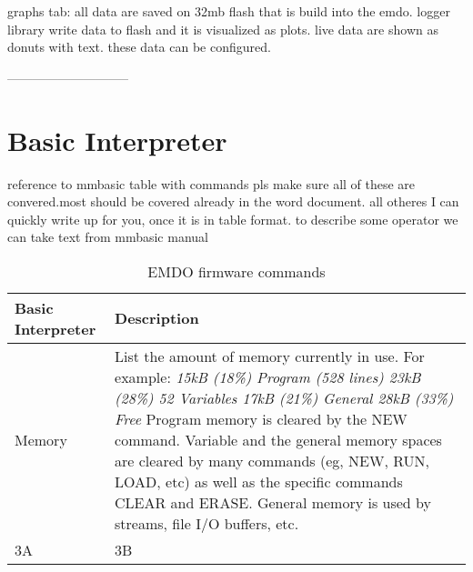 \documentclass[11pt,fleqn]{book} %
\numberwithin{equation}{section} %
\numberwithin{figure}{section} %
\numberwithin{table}{section} %
\begin{document}
graphs tab: all data are saved on 32mb flash that is build into the emdo. logger library write data to flash and it is visualized as plots. live data are shown as donuts with text. these data can be configured.

-----------------------------

\chapter{Basic Interpreter}

reference to mmbasic
table with commands
pls make sure all of these are convered.most should be covered already in the word document. all otheres I can quickly write up for you, once it is in table format. to describe some operator we can take text from mmbasic manual

\begin{table}[]
\centering
\caption{EMDO firmware commands}
\label{my-label}
\begin{tabular}{|p{4cm}|p{10cm}|}
\hline
\textbf{Basic Interpreter} & \textbf{Description}                                                                           \\ \hline
Memory & List the amount of memory currently in use. For example: \newline
 \textit{\newline 15kB (18\%) Program (528 lines) \newline 23kB (28\%) 52 Variables \newline 17kB (21\%) General \newline 28kB (33\%) Free} \newline \newline
Program memory is cleared by the NEW command. Variable and the general memory spaces are cleared by many commands (eg, NEW, RUN, LOAD, etc) as well as the specific commands CLEAR and ERASE. General memory is used by streams, file I/O buffers, etc.   \\ \hline
3A & 3B 
\\ \hline
\end{tabular}
\end{table}
\end{document}
